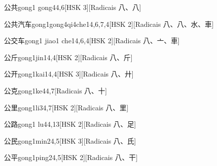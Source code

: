 \begin{entry}{公共}{gong1 gong4}{4,6}[HSK 3][Radicais ⼋、⼋]
\end{entry}

\begin{entry}{公共汽车}{gong1gong4qi4che1}{4,6,7,4}[HSK 2][Radicais ⼋、⼋、⽔、⾞]
\end{entry}

\begin{entry}{公交车}{gong1 jiao1 che1}{4,6,4}[HSK 2][Radicais ⼋、⼇、⾞]
\end{entry}

\begin{entry}{公斤}{gong1jin1}{4,4}[HSK 2][Radicais ⼋、⽄]
\end{entry}

\begin{entry}{公开}{gong1kai1}{4,4}[HSK 3][Radicais ⼋、⼶]
\end{entry}

\begin{entry}{公克}{gong1ke4}{4,7}[Radicais ⼋、⼗]
\end{entry}

\begin{entry}{公里}{gong1li3}{4,7}[HSK 2][Radicais ⼋、⾥]
\end{entry}

\begin{entry}{公路}{gong1 lu4}{4,13}[HSK 2][Radicais ⼋、⾜]
\end{entry}

\begin{entry}{公民}{gong1min2}{4,5}[HSK 3][Radicais ⼋、⽒]
\end{entry}

\begin{entry}{公平}{gong1ping2}{4,5}[HSK 2][Radicais ⼋、⼲]
\end{entry}

